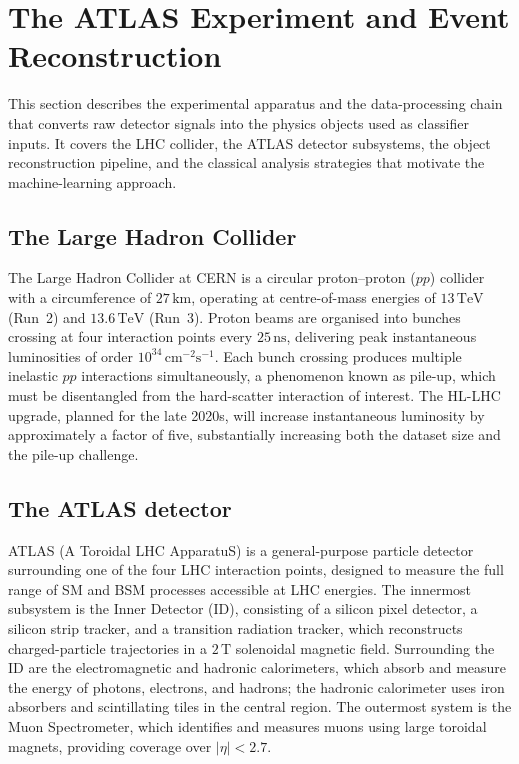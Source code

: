 \section{The ATLAS Experiment and Event Reconstruction}
\label{sec:intro_atlas_experiment}

This section describes the experimental apparatus and the data-processing chain that converts raw detector signals into the physics objects used as classifier inputs.
It covers the LHC collider, the ATLAS detector subsystems, the object reconstruction pipeline, and the classical analysis strategies that motivate the machine-learning approach.

\subsection{The Large Hadron Collider}
\label{subsec:intro_lhc}

The Large Hadron Collider at CERN is a circular proton--proton ($pp$) collider with a circumference of $27\,\mathrm{km}$, operating at centre-of-mass energies of $13\,\mathrm{TeV}$ (Run~2) and $13.6\,\mathrm{TeV}$ (Run~3).
Proton beams are organised into bunches crossing at four interaction points every $25\,\mathrm{ns}$, delivering peak instantaneous luminosities of order $10^{34}\,\mathrm{cm}^{-2}\mathrm{s}^{-1}$.
Each bunch crossing produces multiple inelastic $pp$ interactions simultaneously, a phenomenon known as pile-up, which must be disentangled from the hard-scatter interaction of interest.
The HL-LHC upgrade, planned for the late 2020s, will increase instantaneous luminosity by approximately a factor of five, substantially increasing both the dataset size and the pile-up challenge.


\subsection{The ATLAS detector}
\label{subsec:intro_atlas_detector}

ATLAS (A Toroidal LHC ApparatuS) is a general-purpose particle detector surrounding one of the four LHC interaction points, designed to measure the full range of SM and BSM processes accessible at LHC energies.
The innermost subsystem is the Inner Detector (ID), consisting of a silicon pixel detector, a silicon strip tracker, and a transition radiation tracker, which reconstructs charged-particle trajectories in a $2\,\mathrm{T}$ solenoidal magnetic field.
Surrounding the ID are the electromagnetic and hadronic calorimeters, which absorb and measure the energy of photons, electrons, and hadrons; the hadronic calorimeter uses iron absorbers and scintillating tiles in the central region.
The outermost system is the Muon Spectrometer, which identifies and measures muons using large toroidal magnets, providing coverage over $|\eta| < 2.7$.

